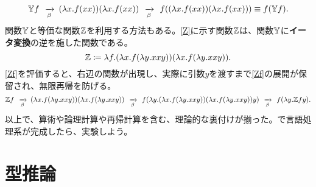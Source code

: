 \documentclass[10pt,a4paper]{book}
\DeclareMathOperator*{\app}{\enspace\xrightarrow[\beta]{}\enspace}
\begin{document}
%
\begin{equation}
\label{eq:Yf}
\Yc{}f
\app (\lambda x.f(xx))(\lambda x.f(xx))
\app f((\lambda x.f(xx))(\lambda x.f(xx)))
\equiv f(\Yc{}f).
\end{equation}
%
関数$\mathbb{Y}$と等価な関数$\mathbb{Z}$を利用する方法もある。\eqref{Z}に示す関数$\mathbb{Z}{}$は、関数$\mathbb{Y}$に\textbf{イータ変換}の逆を施した関数である。
%
\begin{equation}
\label{eq:Z}
\mathbb{Z}{} \coloneqq \lambda f.(\lambda x.f(\lambda y.xxy))(\lambda x.f(\lambda y.xxy)).
\end{equation}
%
\eqref{Zf}を評価すると、右辺の関数が出現し、実際に引数$y$を渡すまで\eqref{Zf}の展開が保留され、無限再帰を防げる。
%
\begin{equation}
\label{eq:Zf}
\Zc{}f
\app (\lambda x.f(\lambda y.xxy))(\lambda x.f(\lambda y.xxy))
\app f(\lambda y.(\lambda x.f(\lambda y.xxy))(\lambda x.f(\lambda y.xxy))y)
\app f(\lambda y.\Zc{}fy).
\end{equation}
%
以上で、算術や論理計算や再帰計算を含む、理論的な裏付けが揃った。で言語処理系が完成したら、実験しよう。

\section{型推論}
\end{document}
